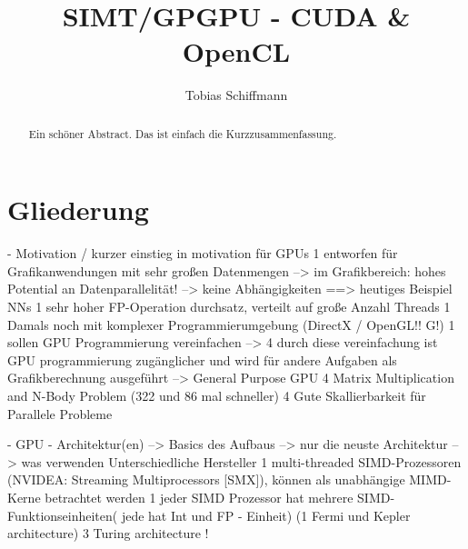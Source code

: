 \documentclass[a4paper,12pt]{llncs}
\numberwithin{equation}{section}
\begin{document}


\author{Tobias Schiffmann}

\title{SIMT/GPGPU - CUDA \& OpenCL}

\maketitle

\thispagestyle{empty}

\begin{abstract}
Ein schöner Abstract. Das ist einfach die Kurzzusammenfassung.
\end{abstract}


\section{Gliederung}
- Motivation / kurzer einstieg in motivation für GPUs
  1 entworfen für Grafikanwendungen mit sehr großen Datenmengen
    --> im Grafikbereich: hohes Potential an Datenparallelität! --> keine Abhängigkeiten
    ==> heutiges Beispiel NNs
  1 sehr hoher FP-Operation durchsatz, verteilt auf große Anzahl Threads
  1 Damals noch mit komplexer Programmierumgebung (DirectX / OpenGL!! G!)
  1 sollen GPU Programmierung vereinfachen
	 --> 4 durch diese vereinfachung ist GPU programmierung zugänglicher und wird für andere Aufgaben als Grafikberechnung ausgeführt --> General Purpose GPU
	 4 Matrix Multiplication and N-Body Problem (322 und 86 mal schneller)
	 4 Gute Skallierbarkeit für Parallele Probleme
	   
- GPU - Architektur(en)
    --> Basics des Aufbaus
    --> nur die neuste Architektur
    --> was verwenden Unterschiedliche Hersteller
    1 multi-threaded SIMD-Prozessoren (NVIDEA: Streaming Multiprocessors [SMX]), können als unabhängige MIMD-Kerne betrachtet werden
    1 jeder SIMD Prozessor hat mehrere SIMD-Funktionseinheiten( jede hat Int und FP - Einheit)
    (1 Fermi und Kepler architecture)
    3 Turing architecture !
    
\end{document}
